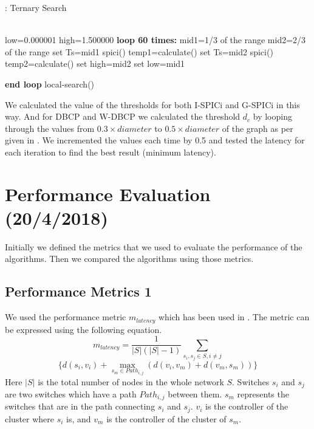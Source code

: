 \documentclass[10pt]{extarticle}
\begin{document}
	\begin{algorithm}
		\caption{: Ternary Search}\label{tsearch}
		\begin{algorithmic}[1]
			 \\
			low=0.000001
			high=1.500000
			\textbf{loop 60 times:}
			\State mid1=1/3 of the range
			\State mid2=2/3 of the range
			\State set Ts=mid1
			\State spici()
			\State temp1=calculate()
			\State set Ts=mid2
			\State spici()
			\State temp2=calculate()
			 set high=mid2
			\Else 
			\State set low=mid1
			\EndIf
			
			\textbf{end loop}
			local-search()        
			\EndProcedure
		\end{algorithmic}
	\end{algorithm} 
	We calculated the value of the thresholds for both I-SPICi and G-SPICi in this way. And for DBCP and W-DBCP we calculated the threshold $d_c$ by looping through the values from $0.3\times diameter$ to $0.5\times diameter$ of the graph as per given in \cite{dbcp}. We incremented the values each time by 0.5 and tested the latency for each iteration to find the best result (minimum latency).
	
	
	\section{Performance Evaluation (20/4/2018)}
	
	Initially we defined the metrics that we used to evaluate the performance of the algorithms. Then we compared the algorithms using those metrics.
	
	\subsection{Performance Metrics 1} \label{perfm}
	
	We used the performance metric $m_{latency}$ which has been used in \cite{dbcp}. The metric can be expressed using the following equation.
	\[m_{latency} = \frac{1}{|S|(|S|-1)}\sum_{s_i,s_j\in S, i\neq j}\]
	\begin{equation}
	\{d(s_i,v_i)+\max_{s_m \in Path_{i,j}}(d(v_i,v_m)+d(v_m,s_m))\}
	\end{equation}
	Here $|S|$ is the total number of nodes in the whole network $S$. Switches $s_i$ and $s_j$ are two switches which have a path $Path_{i,j}$ between them. $s_m$ represents the switches that are in the path connecting $s_i$ and $s_j$. $v_i$ is the controller of the cluster where $s_i$ is, and $v_m$ is the controller of the cluster of $s_m$.
	
\end{document}

